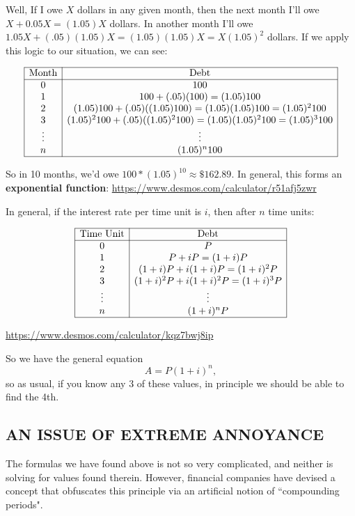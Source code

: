 Well, If I owe $X$ dollars in any given month, then the next month I'll owe $X+0.05X=(1.05)X$ dollars.  In another month I'll owe $1.05X+(.05)(1.05)X=(1.05)(1.05)X=X(1.05)^2$ dollars.  If we apply this logic to our situation, we can see:


$$\begin{array}{|c|c|}
\hline
\text{Month} & \text{Debt}\\
\hline
0 & 100\\
1& 100+(.05)(100)=(1.05)100\\
2& (1.05)100+(.05)((1.05)100)=(1.05)(1.05)100=(1.05)^2 100\\
3 & (1.05)^2100+(.05)((1.05)^2100)=(1.05)(1.05)^2 100=(1.05)^3 100\\
\vdots & \vdots\\
n & (1.05)^n100\\
\hline
\end{array}$$

So in 10 months, we'd owe $100*(1.05)^10\approx \$162.89$.  In general, this forms an \textbf{exponential function}: \url{https://www.desmos.com/calculator/r51afj5zwr}


In general, if the interest rate per time unit is $i$, then after $n$ time units:


$$\begin{array}{|c|c|}
\hline
\text{Time Unit} & \text{Debt}\\
\hline
0 & P\\
1& P+iP=(1+i)P\\
2& (1+i)P+i(1+i)P=(1+i)^2P\\
3 & (1+i)^2P+i(1+i)^2P=(1+i)^3P\\
\vdots & \vdots\\
n & (1+i)^nP\\
\hline
\end{array}$$

\url{https://www.desmos.com/calculator/kqz7bwj8ip}

So we have the general equation $$A=P(1+i)^n,$$ so as usual, if you know any 3 of these values, in principle we should be able to find the 4th.\\

\subsection{AN ISSUE OF EXTREME ANNOYANCE}

The formulas we have found above is not so very complicated, and neither is solving for values found therein.  However, financial companies have devised a concept that obfuscates this principle via an artificial notion of ``compounding periods".\\

